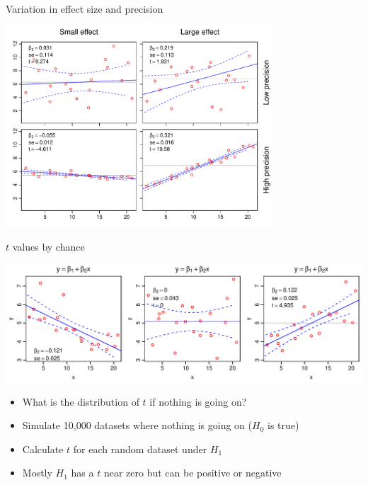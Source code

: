 \documentclass[xcolor=x11names,compress]{beamer}
\renewcommand{\(}{\begin{columns}}
\renewcommand{\)}{\end{columns}}
\newcommand{\<}[1]{\begin{column}{#1}}
\renewcommand{\>}{\end{column}}
\begin{document}
\begin{frame}{Variation in effect size and precision}
	
		\centerline{\includegraphics[height=75mm]{T_examples.pdf}}

\end{frame}

\begin{frame}{$t$ values by chance}

\includegraphics[width=\textwidth]{t_extremes.pdf}

\begin{itemize}
\item What is the distribution of $t$ if nothing is going on?
\item Simulate 10,000 datasets where nothing is going on ($H_0$ is true)
\item Calculate $t$ for each random dataset under $H_1$
\item Mostly $H_1$ has a $t$ near zero but can be positive or negative
\end{itemize}

\end{frame}

\end{document}
